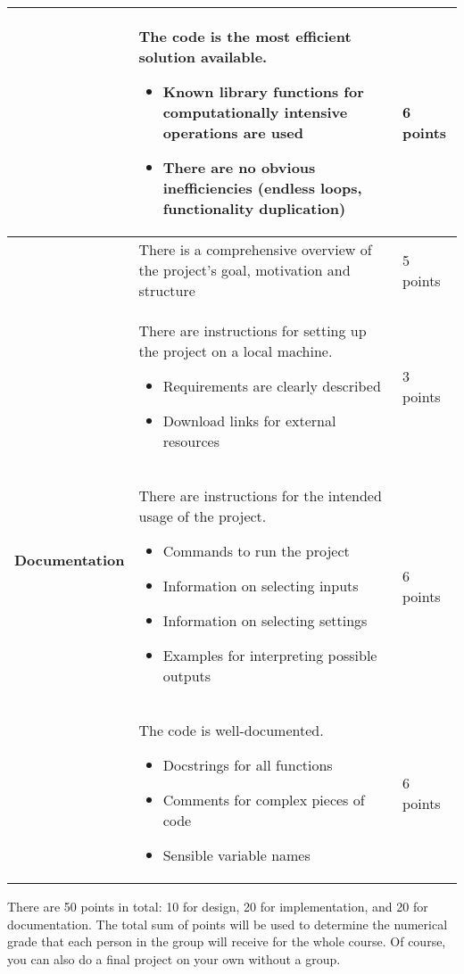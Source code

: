 \documentclass[a4paper,12pt]{report}
\begin{document}
\begin{center}
\begin{tabular}{ | m{} | m{}| m{} | }
  \end{tabular}
  \begin{tabular}{ | m{} | m{}| m{} | } 
  \hline
  & \vspace{4mm} The code is the most efficient solution available.
  \begin{itemize}
    \item Known library functions for computationally intensive operations are used
    \item There are no obvious inefficiencies (endless loops, functionality duplication)
  \end{itemize}
  & 6 points \\ 
  \hline
  \multirow{4}{4em}{\textbf{Documentation}} & \vspace{4mm} There is a comprehensive overview of the project's goal, motivation and structure \vspace{3mm}
  & 5 points \\ 
  \cline{2-3}
  & \vspace{4mm} There are instructions for setting up the project on a local machine.
  \begin{itemize}
    \item Requirements are clearly described
    \item Download links for external resources
  \end{itemize}
  & 3 points \\
  \cline{2-3}
  & There are instructions for the intended usage of the project.
  \begin{itemize}
    \item Commands to run the project
    \item Information on selecting inputs
    \item Information on selecting settings
    \item Examples for interpreting possible outputs
  \end{itemize}
  & 6 points \\
  \cline{2-3}
  & The code is well-documented.
  \begin{itemize}
    \item Docstrings for all functions
    \item Comments for complex pieces of code
    \item Sensible variable names
  \end{itemize}
  & 6 points \\ 
  \hline
\end{tabular}
\end{center}
There are 50 points in total: 10 for design, 20 for implementation, and 20 for documentation.
The total sum of points will be used to determine the numerical grade that each person in the
group will receive for the whole course. Of course, you can also do a final project on your own
without a group.
\end{document}

